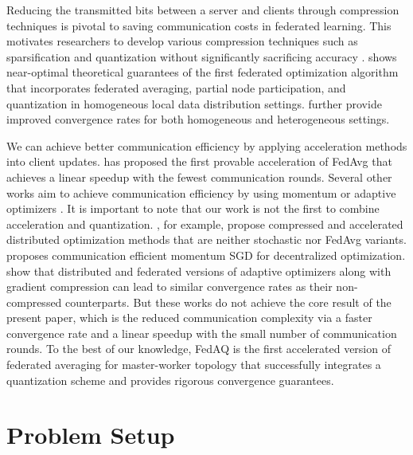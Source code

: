 \documentclass[11pt]{article}
\begin{document}
Reducing the transmitted bits between a server and clients through compression techniques is pivotal to saving communication costs in federated learning. This motivates researchers to develop various compression techniques such as sparsification and quantization without significantly sacrificing accuracy \cite{Yeojoon-konevcny2016federated, Yeojoon-alistarh2017qsgd, Yeojoon-suresh2017distributed, Yeojoon-wangni2017gradient, Yeojoon-bernstein2018signsgd, Yeojoon-wang2018atomo, Yeojoon-vogels2019powersgd, Yeojoon-horvath2019natural, Yeojoon-basu2019qsparse, Yeojoon-rothchild2020fetchsgd}. \cite{Yeojoon-reisizadeh2020fedpaq} shows near-optimal theoretical guarantees of the first federated optimization algorithm that incorporates federated averaging, partial node participation, and quantization in homogeneous local data distribution settings. \cite{Yeojoon-haddadpour2021federated} further provide improved convergence rates for both homogeneous and heterogeneous settings.

We can achieve better communication efficiency by applying acceleration methods into client updates. \cite{Yeojoon-yuan2020federated} has proposed the first provable acceleration of FedAvg that achieves a linear speedup with the fewest communication rounds. Several other works aim to achieve communication efficiency by using momentum or adaptive optimizers \cite{Yeojoon-yu2019linear, Yeojoon-karimireddy2020mime, Yeojoon-wang2021local}. It is important to note that our work is not the first to combine acceleration and quantization.  \cite{Yeojoon-li2020acceleration, Yeojoon-li2021canita}, for example, propose compressed and accelerated distributed optimization methods that are neither stochastic nor FedAvg variants. \cite{Yeojoon-singh2021squarm} proposes communication efficient momentum SGD for decentralized optimization. \cite{Yeojoon-li2022distributed, Yeojoon-wang2022communication} show that distributed and federated versions of adaptive optimizers along with gradient compression can lead to similar convergence rates as their non-compressed counterparts. But these works do not achieve the core result of the present paper, which is the reduced communication complexity via a faster convergence rate and a linear speedup with the small number of communication rounds. To the best of our knowledge, FedAQ is the first accelerated version of federated averaging for master-worker topology that successfully integrates a quantization scheme and provides rigorous convergence guarantees.

\section{Problem Setup} \label{problem_setup}
\end{document}
